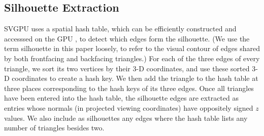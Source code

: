 \documentclass[review]{acmsiggraph}
\begin{document}
\subsection{Silhouette Extraction} \label{sec:silhouette}
SVGPU uses a spatial hash table, which can be efficiently constructed and
accesssed on the GPU \cite{lefebvre2006}, to detect which edges form the
silhouette. (We use the term silhouette in this paper loosely, to refer to the
visual contour of edges shared by both frontfacing and backfacing triangles.)
For each of the three edges of
every triangle, we sort its two vertices by their 3-D coordinates, and use
these sorted 3-D coordinates to create a hash key. We then add the triangle to
the hash table at three places corresponding to the hash keys of its three
edges. Once all triangles have been entered into the hash table, the silhouette
edges are extracted as entries whose normals (in projected viewing coordinates)
have oppositely signed $z$ values. We also include as silhouettes any edges
where the hash table lists any number of triangles besides two.


\end{document}
